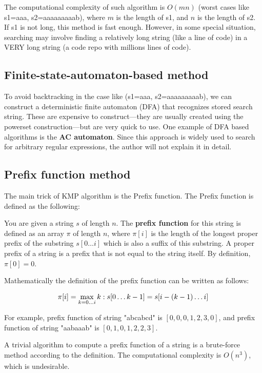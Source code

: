\documentclass[cn,black,12pt,normal]{elegantnote}
\begin{document}
The computational complexity of such algorithm is $O(mn)$ (worst cases like s1=aaa, s2=aaaaaaaaab), where $m$ is the length of s1, and $n$ is the length of s2. If s1 is not long, this method is fast enough. However, in some special situation, searching may involve finding a relatively long string (like a line of code) in a VERY long string (a code repo with millions lines of code).

\subsection{Finite-state-automaton-based method}
To avoid backtracking in the case like (s1=aaa, s2=aaaaaaaaab), we can construct a deterministic finite automaton (DFA) that recognizes stored search string. These are expensive to construct—they are usually created using the powerset construction—but are very quick to use. One example of DFA based algorithms is the \textbf{AC automaton}. Since this approach is widely used to search for arbitrary regular expressions, the author will not explain it in detail.

\subsection{Prefix function method}

The main trick of KMP algorithm is the Prefix function. The Prefix function is defined as the following:

You are given a string $s$ of length $n$. The \textbf{prefix function} for this string is defined as an array $\pi$ of length $n$, where $\pi[i]$ is the length of the longest proper prefix of the substring $s[0 \dots i]$ which is also a suffix of this substring. A proper prefix of a string is a prefix that is not equal to the string itself. By definition, $\pi[0] = 0$.

Mathematically the definition of the prefix function can be written as follows:

$$\pi[i] = \max_ {k = 0 \dots i} \\{k : s[0 \dots k-1] = s[i-(k-1) \dots i] \\}$$

For example, prefix function of string "abcabcd" is $[0, 0, 0, 1, 2, 3, 0]$, and prefix function of string "aabaaab" is $[0, 1, 0, 1, 2, 2, 3]$.

A trivial algorithm to compute a prefix function of a string is a brute-force method according to the definition. The computational complexity is $O(n^3)$, which is undesirable.
\end{document}
